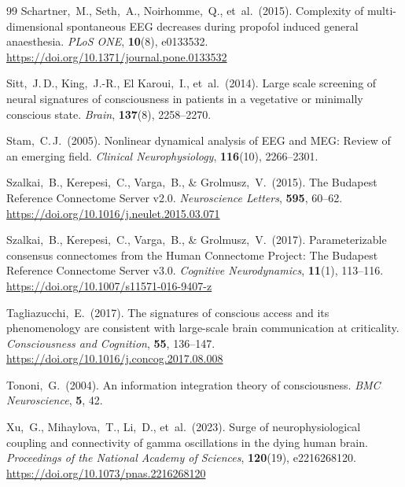 \documentclass[11pt,a4paper]{article}
\theoremstyle{plain}
\theoremstyle{definition}
\theoremstyle{remark}
\begin{document}
\begin{thebibliography}{99}
Schartner,~M., Seth,~A., Noirhomme,~Q., et~al.\ (2015).
Complexity of multi-dimensional spontaneous EEG decreases during propofol induced general anaesthesia.
\textit{PLoS ONE}, \textbf{10}(8), e0133532.
\url{https://doi.org/10.1371/journal.pone.0133532}

Sitt,~J.\,D., King,~J.-R., El Karoui,~I., et~al.\ (2014).
Large scale screening of neural signatures of consciousness in patients in a vegetative or minimally conscious state.
\textit{Brain}, \textbf{137}(8), 2258--2270.

Stam,~C.\,J.\ (2005).
Nonlinear dynamical analysis of EEG and MEG: Review of an emerging field.
\textit{Clinical Neurophysiology}, \textbf{116}(10), 2266--2301.

Szalkai,~B., Kerepesi,~C., Varga,~B., \& Grolmusz,~V.\ (2015).
The Budapest Reference Connectome Server v2.0.
\textit{Neuroscience Letters}, \textbf{595}, 60--62.
\url{https://doi.org/10.1016/j.neulet.2015.03.071}

Szalkai,~B., Kerepesi,~C., Varga,~B., \& Grolmusz,~V.\ (2017).
Parameterizable consensus connectomes from the Human Connectome Project: The Budapest Reference Connectome Server v3.0.
\textit{Cognitive Neurodynamics}, \textbf{11}(1), 113--116.
\url{https://doi.org/10.1007/s11571-016-9407-z}

Tagliazucchi,~E.\ (2017).
The signatures of conscious access and its phenomenology are consistent with large-scale brain communication at criticality.
\textit{Consciousness and Cognition}, \textbf{55}, 136--147.
\url{https://doi.org/10.1016/j.concog.2017.08.008}

Tononi,~G.\ (2004).
An information integration theory of consciousness.
\textit{BMC Neuroscience}, \textbf{5}, 42.

Xu,~G., Mihaylova,~T., Li,~D., et~al.\ (2023).
Surge of neurophysiological coupling and connectivity of gamma oscillations in the dying human brain.
\textit{Proceedings of the National Academy of Sciences}, \textbf{120}(19), e2216268120.
\url{https://doi.org/10.1073/pnas.2216268120}

\end{thebibliography}
\end{document}
